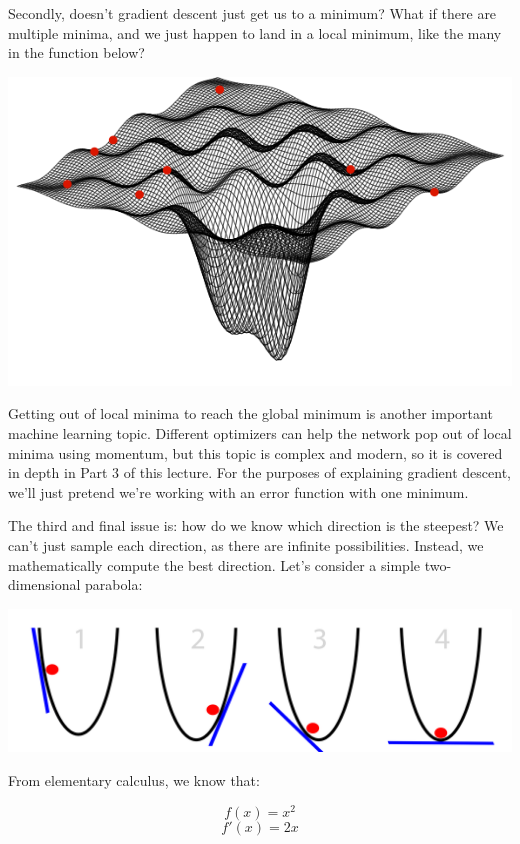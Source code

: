 \documentclass{article}
\begin{document}
Secondly, doesn't gradient descent just get us to a minimum? What if there are multiple minima, and we just happen to land in a local minimum, like the many in the function below?
\begin{center}
\includegraphics[scale=0.9]{minima}
\end{center}

Getting out of local minima to reach the global minimum is another important machine learning topic. Different optimizers can help the network pop out of local minima using momentum, but this topic is complex and modern, so it is covered in depth in Part 3 of this lecture. For the purposes of explaining gradient descent, we'll just pretend we're working with an error function with one minimum.

The third and final issue is: how do we know which direction is the steepest? We can't just sample each direction, as there are infinite possibilities. Instead, we mathematically compute the best direction. Let's consider a simple two-dimensional parabola:

\begin{center}
\includegraphics[scale=0.7]{sgd_optimal}
\end{center}

From elementary calculus, we know that:

\[f(x) = x^2\]
\[f'(x) = 2x\]
\end{document}
